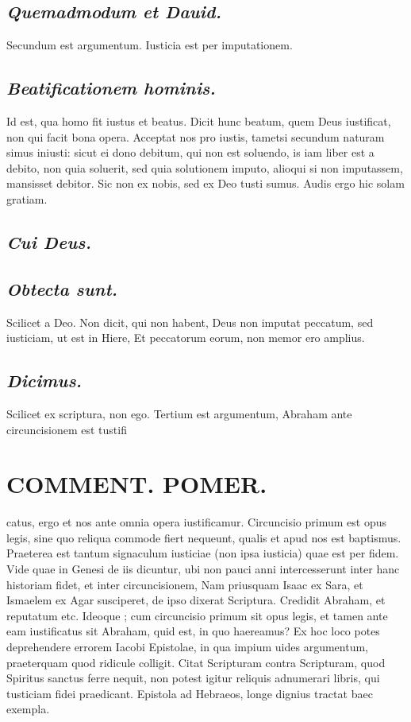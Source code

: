 \documentclass{article}
\begin{document}
\begin{pages}
\subsection*{\textit{Quemadmodum et Dauid. }}\pstart Secundum est argumentum. Iusticia est per imputationem.   \pend
{}
{}
\subsection*{\textit{Beatificationem hominis. }}\pstart Id est, qua homo fit iustus et beatus.   \pend\pstart Dicit hunc beatum, quem Deus iustificat, non qui facit bona opera. Acceptat nos pro iustis, tametsi secundum naturam simus iniusti: sicut ei dono debitum, qui non est soluendo, is iam liber est a debito, non quia soluerit, sed quia solutionem imputo, alioqui si non imputassem, mansisset debitor. Sic non ex nobis, sed ex Deo tusti sumus. Audis ergo hic solam gratiam.   \pend
{}
{}
\subsection*{\textit{Cui Deus. }}
{}
\subsection*{\textit{Obtecta sunt. }}\pstart Scilicet a Deo. Non dicit, qui non habent, Deus non imputat peccatum, sed iusticiam, ut est in Hiere, Et peccatorum eorum, non memor ero amplius.   \pend
{}
{}
\subsection*{\textit{Dicimus. }}\pstart Scilicet ex scriptura, non ego. Tertium est argumentum, Abraham ante circuncisionem est tustifi\pend
\section*{COMMENT. POMER.  }\pstart catus, ergo et nos ante omnia opera iustificamur.  Circuncisio primum est opus legis, sine quo reliqua commode fiert nequeunt, qualis et apud nos est baptismus. Praeterea est tantum signaculum iusticiae (non ipsa iusticia) quae est per fidem. Vide quae in Genesi de iis dicuntur, ubi non pauci anni intercesserunt inter hanc historiam fidet, et inter circuncisionem, Nam priusquam Isaac ex Sara, et Ismaelem ex Agar susciperet, de ipso dixerat Scriptura. Credidit Abraham, et reputatum etc. Ideoque ; cum circuncisio primum sit opus legis, et tamen ante eam iustificatus sit Abraham, quid est, in quo haereamus? Ex hoc loco potes deprehendere errorem Iacobi Epistolae, in qua impium uides argumentum, praeterquam quod ridicule colligit. Citat Scripturam contra Scripturam, quod Spiritus sanctus ferre nequit, non potest igitur reliquis adnumerari libris, qui tusticiam fidei praedicant. Epistola ad Hebraeos, longe dignius tractat baec exempla.   \pend
{}
{}

\end{pages}
\end{document}
